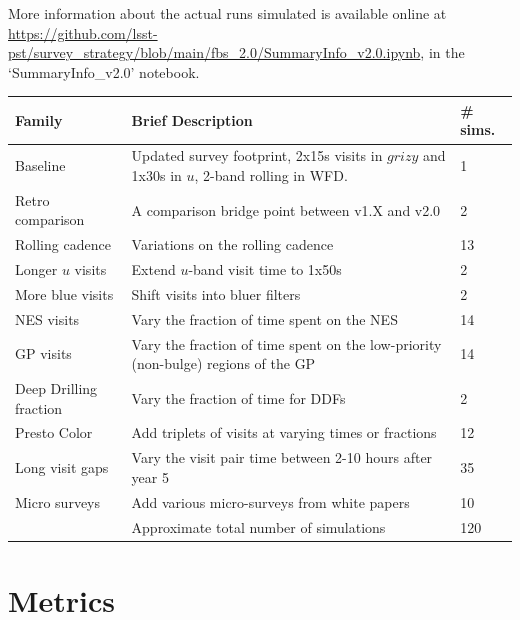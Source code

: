  More information about the actual runs simulated is available online at \url{https://github.com/lsst-pst/survey_strategy/blob/main/fbs_2.0/SummaryInfo_v2.0.ipynb}, in the 
 `SummaryInfo\_v2.0' notebook. 
 
\vskip 0.4in


\begin{table}[]
\begin{tabular}{l | L | l}
Family               & Brief Description       &    \# sims.   \\
\hline\hline
Baseline            & Updated survey footprint, 2x15s visits in $grizy$ and 1x30s in $u$, 2-band rolling in WFD. &   1     \\
Retro comparison     & A comparison bridge point between v1.X and v2.0  & 2 \\
Rolling cadence      & Variations on the rolling cadence   & 13  \\
Longer $u$ visits  & Extend $u$-band visit time to 1x50s    &    2 \\
More blue visits & Shift visits into bluer filters & 2 \\
NES visits & Vary the fraction of time spent on the NES & 14 \\
GP visits & Vary the fraction of time spent on the low-priority (non-bulge) regions of the GP & 14 \\
Deep Drilling fraction & Vary the fraction of time for DDFs & 2 \\
Presto Color & Add triplets of visits at varying times or fractions  & 12 \\
Long visit gaps & Vary the visit pair time between 2-10 hours after year 5  &  35 \\
Micro surveys & Add various micro-surveys from white papers  & 10 \\
\hline
 & Approximate total number of simulations &  120 \\
\hline
\end{tabular}
\end{table}\label{tab:shortlist}


\section{Metrics}

